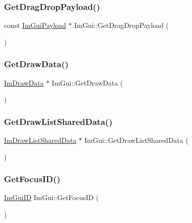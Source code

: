 \subsubsection{\texorpdfstring{Get\+Drag\+Drop\+Payload()}{GetDragDropPayload()}}
{\footnotesize\ttfamily const \mbox{\hyperlink{struct_im_gui_payload}{Im\+Gui\+Payload}} $\ast$ Im\+Gui\+::\+Get\+Drag\+Drop\+Payload (\begin{DoxyParamCaption}{ }\end{DoxyParamCaption})}

\mbox{\label{namespace_im_gui_ab73131dc44b1267dac04f0c2bb0af983}} 
\subsubsection{\texorpdfstring{Get\+Draw\+Data()}{GetDrawData()}}
{\footnotesize\ttfamily \mbox{\hyperlink{struct_im_draw_data}{Im\+Draw\+Data}} $\ast$ Im\+Gui\+::\+Get\+Draw\+Data (\begin{DoxyParamCaption}{ }\end{DoxyParamCaption})}

\mbox{\label{namespace_im_gui_a2a5a77bd5b6215e8cb47a8a457224a52}} 
\subsubsection{\texorpdfstring{Get\+Draw\+List\+Shared\+Data()}{GetDrawListSharedData()}}
{\footnotesize\ttfamily \mbox{\hyperlink{struct_im_draw_list_shared_data}{Im\+Draw\+List\+Shared\+Data}} $\ast$ Im\+Gui\+::\+Get\+Draw\+List\+Shared\+Data (\begin{DoxyParamCaption}{ }\end{DoxyParamCaption})}

\mbox{\label{namespace_im_gui_a2657245e3c14385d8caf03e06a8b76aa}} 
\subsubsection{\texorpdfstring{Get\+Focus\+I\+D()}{GetFocusID()}}
{\footnotesize\ttfamily \mbox{\hyperlink{imgui_8h_a1785c9b6f4e16406764a85f32582236f}{Im\+Gui\+ID}} Im\+Gui\+::\+Get\+Focus\+ID (\begin{DoxyParamCaption}{ }\end{DoxyParamCaption})\hspace{0.3cm}{\ttfamily [inline]}}

